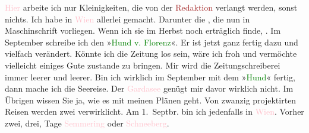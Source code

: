 \pstart
           \textcolor{pink}{Hier}{}\ledrightnote{{$\rightarrow$}\textcolor{pink}{Marienbad}} arbeite ich nur
               Kleinigkeiten, die von der \textcolor{brown}{Redaktion}{}\ledrightnote{{$\rightarrow$}\textcolor{brown}{Die Zeit}} verlangt werden, sonst nichts. Ich habe in \textcolor{pink}{Wien}{}\ledrightnote{\textcolor{pink}{Wien}} allerlei gemacht. Darunter die \label{K_L03510-5v}\label{K_L03510-5h}, die nun in Maschinschrift vorliegen. Wenn ich sie im Herbst noch erträglich
               finde, \label{K_L03510-6v}\label{K_L03510-6h}. Im September schreibe ich den »\textcolor{green}{Hund v. Florenz}{}\ledrightnote{\textcolor{green}{Der Hund von Florenz}}«. Er ist jetzt ganz fertig dazu
               und vielfach verändert. Könnte ich die Zeitung los sein, wäre ich froh und vermöchte
               vielleicht einiges Gute zustande zu bringen. Mir wird die Zeitungschreiberei immer
               leerer und leerer. Bin ich wirklich im September mit dem
                  »\textcolor{green}{Hund}{}\ledrightnote{\textcolor{green}{Der Hund von Florenz}}« fertig, dann mache ich die Seereise.
               Der \textcolor{pink}{Gardasee}{}\ledrightnote{\textcolor{pink}{Lago di Garda}} genügt mir davor wirklich nicht.
               Im Übrigen wissen Sie ja, wie es mit meinen Plänen geht. Von zwanzig projektirten
               Reisen werden zwei verwirklicht. Am 1. Septbr. bin ich
               jedenfalls in \textcolor{pink}{Wien}{}\ledrightnote{\textcolor{pink}{Wien}}. Vorher zwei, drei, Tage \textcolor{pink}{Semmering}{}\ledrightnote{\textcolor{pink}{Semmering}} oder \textcolor{pink}{Schneeberg}{}\ledrightnote{\textcolor{pink}{Schneeberg}}.\pend
           
